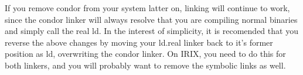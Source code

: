If you remove condor from your system latter on, linking will continue to
work, since the condor linker will always resolve that you are compiling
normal binaries and simply call the real ld.  In the interest of simplicity,
it is recomended that you reverse the above changes by moving your ld.real
linker back to it's former position as ld, overwriting the condor linker.  On
IRIX, you need to do this for both linkers, and you will probably want to
remove the symbolic links as well.


